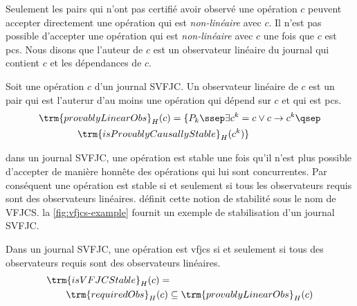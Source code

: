 Seulement les pairs qui n'ont pas certifié avoir observé une opération $c$ peuvent accepter directement une opération qui est \emph{non-linéaire} avec $c$.
Il n'est pas possible d'accepter une opération qui est \emph{non-linéaire} avec $c$ une fois que $c$ est \ac{pcs}.
Nous disons que l'auteur de $c$ est un observateur linéaire du journal qui contient $c$ et les dépendances de $c$.

\begin{definition}\label{def:linear-obs}
Soit une opération $c$ d'un journal \ac{SVFJC}.
Un observateur linéaire de $c$ est un pair qui est l'auterur d'au moins une opération qui dépend sur $c$ et qui est \acl{pcs}.
\begin{align*}
&\trm{provablyLinearObs}_H(c) = \{P_k \ssep \exists c^k = c \lor c \to c^k \qsep\\
&\qquad\qquad\trm{isProvablyCausallyStable}_H(c^k)\}
\end{align*}
\end{definition}

dans un journal \ac{SVFJC}, une opération est stable une fois qu'il n'est plus possible d'accepter de manière honnête des opérations qui lui sont concurrentes.
Par conséquent une opération est stable si et seulement si tous les observateurs requis sont des observateurs linéaires.
 définit cette notion de stabilité sous le nom de \acf{VFJCS}.
la \autoref{fig:vfjcs-example} fournit un exemple de stabilisation d'un journal \ac{SVFJC}.

\begin{definition}\label{def:vfjcs}
Dans un journal \ac{SVFJC}, une opération est \acl{vfjcs} si et seulement si tous des observateurs requis sont des observateurs linéaires.
\begin{align*}
&\trm{isVFJCStable}_H(c) =\\
&\qquad\trm{requiredObs}_H(c) \subseteq \trm{provablyLinearObs}_H(c)
\end{align*}
\end{definition}

